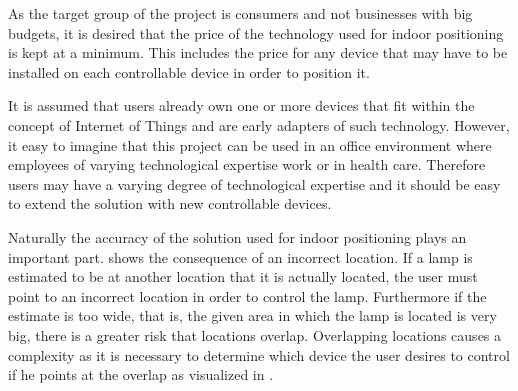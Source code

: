 As the target group of the project is consumers and not businesses with big budgets, it is desired that the price of the technology used for indoor positioning is kept at a minimum. This includes the price for any device that may have to be installed on each controllable device in order to position it.

It is assumed that users already own one or more devices that fit within the concept of Internet of Things and are early adapters of such technology. However, it easy to imagine that this project can be used in an office environment where employees of varying technological expertise work or in health care. Therefore users may have a varying degree of technological expertise and it should be easy to extend the solution with new controllable devices.

Naturally the accuracy of the solution used for indoor positioning plays an important part. 
 shows the consequence of an incorrect location. 
If a lamp is estimated to be at another location that it is actually located, 
the user must point to an incorrect location in order to control the lamp.
Furthermore if the estimate is too wide, that is, the given area in which the lamp is located is very big, there is a greater risk that locations overlap. 
Overlapping locations causes a complexity as it is necessary to determine which device the user desires to control if he points at the overlap as visualized in .

